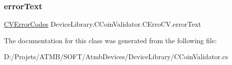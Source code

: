 \mbox{\label{class_device_library_1_1_c_coin_validator_1_1_c_erro_c_v_a0d512c6ac4b9a6e46c8161b4e9cf9828}} 
\subsubsection{\texorpdfstring{error\+Text}{errorText}}
{\footnotesize\ttfamily \mbox{\hyperlink{group___erreur_ga68c5b73cc3b337502d9f92154d933591}{C\+V\+Error\+Codes}} Device\+Library.\+C\+Coin\+Validator.\+C\+Erro\+C\+V.\+error\+Text}







The documentation for this class was generated from the following file\+:\begin{DoxyCompactItemize}
\item 
D\+:/\+Projets/\+A\+T\+M\+B/\+S\+O\+F\+T/\+Atmb\+Devices/\+Device\+Library/C\+Coin\+Validator.\+cs\end{DoxyCompactItemize}
